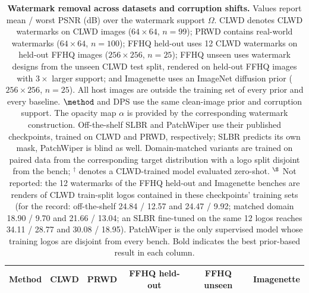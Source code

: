 \begin{table}[t]
    \centering
    \caption{
    \textbf{Watermark removal across datasets and corruption shifts.}
    Values report mean / worst PSNR (dB) over the watermark support $\Omega$.
    CLWD denotes CLWD watermarks on CLWD images ($64\times64$, $n=99$);
    PRWD contains real-world watermarks ($64\times64$, $n=100$);
    FFHQ held-out uses 12 CLWD watermarks on held-out FFHQ images
    ($256\times256$, $n=25$);
    FFHQ unseen uses watermark designs from the unseen CLWD test split,
    rendered on held-out FFHQ images with $3\times$ larger support;
    and Imagenette uses an ImageNet diffusion prior
    ($256\times256$, $n=25$).
    All host images are outside the training set of every prior and every baseline.
    $\method$ and DPS use the same clean-image prior and corruption support.
    The opacity map $\alpha$ is provided by the corresponding watermark
    construction.
    Off-the-shelf SLBR and PatchWiper use their published checkpoints,
    trained on CLWD and PRWD, respectively; SLBR predicts its own mask,
    PatchWiper is blind as well.
    Domain-matched variants are trained on paired data from the corresponding
    target distribution with a logo split disjoint from the bench;
    $^\dagger$ denotes a CLWD-trained model evaluated zero-shot.
    $^\S$ Not reported: the 12 watermarks of the FFHQ held-out and Imagenette
    benches are renders of CLWD train-split logos contained in these
    checkpoints' training sets (for the record: off-the-shelf 24.84 / 12.57 and
    24.47 / 9.92; matched domain 18.90 / 9.70 and 21.66 / 13.04; an SLBR
    fine-tuned on the same 12 logos reaches 34.11 / 28.77 and 30.08 / 18.95).
    PatchWiper is the only supervised model whose training logos are disjoint
    from every bench.
    Bold indicates the best prior-based result in each column.
    }
    \label{tab:wm_datasets}
    \small
    \setlength{\tabcolsep}{3.2pt}
    \renewcommand{\arraystretch}{1.08}
    \begin{tabular}{@{}lccccc@{}}
        \toprule
        \textbf{Method}
        & \textbf{CLWD}
        & \textbf{PRWD}
        & \textbf{FFHQ held-out}
        & \textbf{FFHQ unseen}
        & \textbf{Imagenette} \\
        \midrule


\end{tabular}
\end{table}
